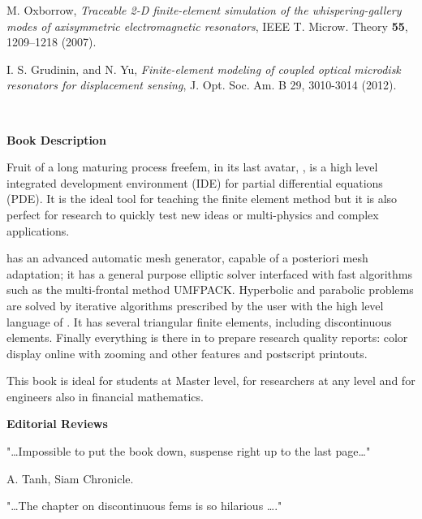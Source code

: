 \documentclass[a4paper,twoside,12pt]{book}
\begin{document}
\begin{thebibliography}{xx}
 M. Oxborrow, {\it Traceable 2-D finite-element simulation of the whispering-gallery modes of axisymmetric electromagnetic resonators}, IEEE T. Microw. Theory \textbf{55}, 1209--1218 (2007).

 I. S. Grudinin, and N. Yu, {\it  Finite-element modeling of coupled optical microdisk resonators for displacement sensing}, J. Opt. Soc. Am. B 29, 3010-3014 (2012). 

\end{thebibliography}
\printindex
\cleardoublepage
\thispagestyle{empty}
~
\newpage
\thispagestyle{empty}
\normalsize
{}

\normalsize
\vglue-1cm
\textbf{Book Description}
\medskip

Fruit of a long maturing process freefem, in its last avatar, \freefempp, is a high level integrated development environment (IDE)  for partial differential equations (PDE).  It is the ideal tool for teaching the finite element method but it is also perfect for research to quickly test new ideas or multi-physics and complex applications.
\medskip

\freefempp has an advanced automatic mesh generator, capable of a posteriori mesh adaptation; it has a general purpose elliptic solver  interfaced with fast algorithms such as the multi-frontal method UMFPACK. Hyperbolic and parabolic problems are solved by iterative algorithms prescribed by the user with the high level language of \freefempp. It has several triangular  finite elements, including discontinuous elements.  Finally everything is there in \freefempp to prepare research quality reports: color display online with zooming and other features and postscript printouts.

\medskip
This book is ideal for students at Master level, for  researchers at any level and for engineers also in financial mathematics.

\bigskip

\textbf{Editorial Reviews}
 \medskip

"\ldots Impossible to put the book down, suspense right up to the last page\ldots"

{\sc A. Tanh},  Siam Chronicle.
 \medskip

"\ldots  The chapter on discontinuous fems is so hilarious \ldots."
\end{document}
